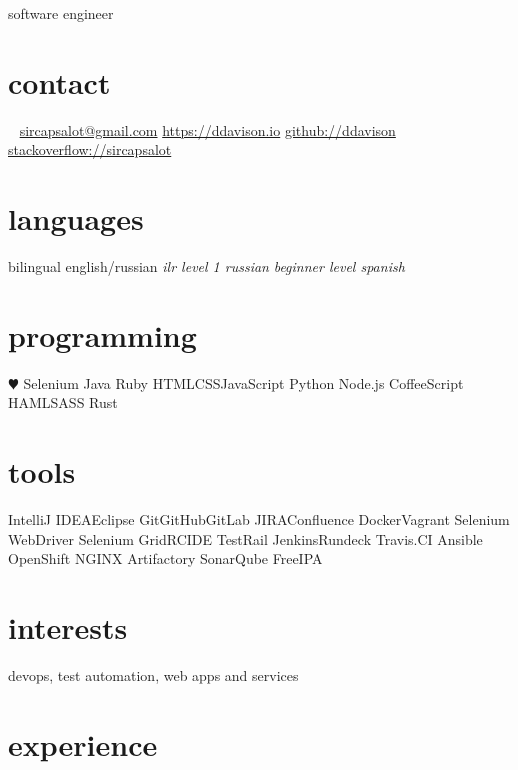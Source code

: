 \documentclass[]{ddavison-resume}
\begin{document}
       {software engineer}


\begin{aside}
  \section{contact}
    ~
    \href{mailto:sircapsalot@gmail.com}{sircapsalot@gmail.com}
    \href{https://ddavison.io}{https://ddavison.io}
    \href{https://github.com/ddavison}{github://ddavison}
    \href{https://stackoverflow.com/users/1695163/sircapsalot}{stackoverflow://sircapsalot}
  \section{languages}
    bilingual english/russian
	\emph{ilr level 1 russian}
	\emph{beginner level spanish}
  \section{programming}
    {\color{red} $\varheartsuit$} Selenium
	Java     
    Ruby
    HTML\bullet CSS\bullet JavaScript
    Python    
    Node.js
    CoffeeScript
    HAML\bullet SASS
    Rust
  \section{tools}
	IntelliJ IDEA\bullet Eclipse  	
	Git\bullet GitHub\bullet GitLab	
  	JIRA\bullet Confluence
  	Docker\bullet Vagrant
  	Selenium WebDriver
  	Selenium Grid\bullet RC\bullet IDE
  	TestRail
  	Jenkins\bullet Rundeck
  	Travis.CI
  	Ansible
  	OpenShift
  	NGINX
  	Artifactory
  	SonarQube
  	FreeIPA
\end{aside}

\section{interests}

devops, test automation, web apps and services

\section{experience}
\end{document}
